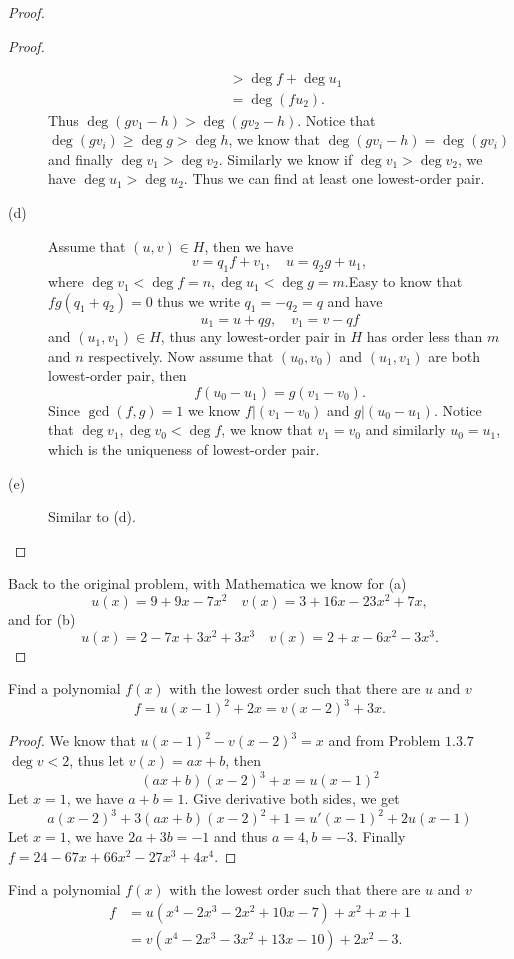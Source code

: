 \begin{proof}
\begin{proof}
\begin{description}
\begin{align*}
					   &>\deg f+\deg u_1\\
					   &=\deg (fu_2).
			\end{align*}
			Thus $\deg (gv_1-h)>\deg (gv_2-h)$. Notice that $\deg (gv_i)\geq \deg g>\deg h$, we know that $\deg (gv_i-h)=\deg (gv_i)$ and finally $\deg v_1>\deg v_2$. Similarly we know if $\deg v_1>\deg v_2$, we have $\deg u_1>\deg u_2$. 
			Thus we can find at least one lowest-order pair.
			\item[(d)] Assume that $(u,v)\in H$, then we have  
			\[v=q_1f+v_1,\quad u=q_2g+u_1,\]
			where $\deg v_1<\deg f=n,\deg u_1<\deg g=m$.Easy to know that $fg(q_1+q_2)=0$ thus we write $q_1=-q_2=q$ and have
			\[u_1=u+qg,\quad v_1=v-qf\]
			and $(u_1,v_1)\in H$, thus any lowest-order pair in $H$ has order less than $m$ and $n$ respectively.
			Now assume that $(u_0,v_0)$ and $(u_1,v_1)$ are both lowest-order pair, then 
			\[f(u_0-u_1)=g(v_1-v_0).\]
			Since $\gcd (f,g)=1$ we know $f|(v_1-v_0)$ and $g|(u_0-u_1)$. Notice that $\deg v_1,\deg v_0<\deg f$, we know that $v_1=v_0$ and similarly $u_0=u_1$, which is the uniqueness of lowest-order pair.
			\item[(e)] Similar to (d).
		\end{description}\qedhere
	\end{proof}
	Back to the original problem, with \textsf{Mathematica} we know for (a)
	\[u(x)=9+9x-7x^2\quad v(x)=3+16x-23x^2+7x,\]
	and for (b)
	\[u(x)=2-7x+3x^2+3x^3\quad v(x)=2+x-6x^2-3x^3.\]
\end{proof}

\begin{pro}%
	Find a polynomial $f(x)$ with the lowest order such that there are $u$ and $v$
	\[f=u(x-1)^2+2x=v(x-2)^3+3x.\]
\end{pro}
\begin{proof}
	We know that $u(x-1)^2-v(x-2)^3=x$ and from Problem $1.3.7$ $\deg v<2$, thus let $v(x)=ax+b$, then
	\[(ax+b)(x-2)^3+x=u(x-1)^2\]
	Let $x=1$, we have $a+b=1$. Give derivative both sides, we get
	\[a(x-2)^3+3(ax+b)(x-2)^2+1=u'(x-1)^2+2u(x-1)\]
	Let $x=1$, we have $2a+3b=-1$ and thus $a=4,b=-3$. Finally $f=24 - 67 x + 66 x^2 - 27 x^3 + 4 x^4$.
\end{proof}

\begin{pro}%
	Find a polynomial $f(x)$ with the lowest order such that there are $u$ and $v$
	\begin{align*}f&=u(x^4-2x^3-2x^2+10x-7)+x^2+x+1\\
	&=v(x^4-2x^3-3x^2+13x-10)+2x^2-3.\end{align*}
\end{pro}

